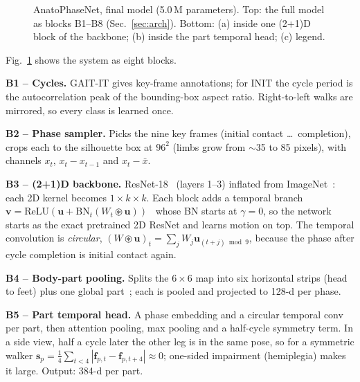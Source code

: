 \documentclass[conference]{IEEEtran}
\newcommand{\opbar}[4]{%
  \shadedraw[top color=#4!20, bottom color=#4!65, draw=#4!70!black]
    ({#1-1.5},{#2-#3/2}) rectangle ({#1+1.5},{#2+#3/2});}
\begin{document}
\begin{figure}[!t]
{}
\caption{AnatoPhaseNet, final model (5.0\,M parameters). Top: the full model as blocks
B1--B8 (Sec.~\ref{sec:arch}). Bottom: (a) inside one (2+1)D block of the backbone;
(b) inside the part temporal head; (c) legend.}
\label{fig:arch}
\end{figure}

Fig.~\ref{fig:arch} shows the system as eight blocks.

\textbf{B1 -- Cycles.} GAIT-IT gives key-frame annotations; for INIT the
cycle period is the autocorrelation peak of the bounding-box aspect ratio.
Right-to-left walks are mirrored, so every class is learned once.

\textbf{B2 -- Phase sampler.} Picks the nine key frames (initial contact
\dots\ completion), crops each to the silhouette box at $96^2$ (limbs grow from
$\sim$35 to 85 pixels), with channels $x_t$, $x_t-x_{t-1}$ and $x_t-\bar x$.

\textbf{B3 -- (2+1)D backbone.} ResNet-18~\cite{he2016resnet} (layers 1--3)
inflated from ImageNet~\cite{carreira2017i3d}: each 2D kernel becomes
$1{\times}k{\times}k$. Each block adds a temporal branch $\mathbf{v}=\mathrm{ReLU}(\mathbf{u}+\mathrm{BN}_t(W_t\circledast
\mathbf{u}))$~\cite{tran2018r21d} whose BN starts at $\gamma=0$, so the network
starts as the exact pretrained 2D ResNet and learns motion on top. The temporal
convolution is \emph{circular}, $(W\circledast\mathbf{u})_t=\sum_j
W_j\mathbf{u}_{(t+j)\bmod 9}$, because the phase after cycle completion is
initial contact again.

\textbf{B4 -- Body-part pooling.} Splits the $6\times6$ map into six horizontal
strips (head to feet) plus one global part~\cite{chao2019gaitset}; each is
pooled and projected to 128-d per phase.

\textbf{B5 -- Part temporal head.} A phase embedding and a circular
temporal conv per part, then attention pooling, max pooling and a half-cycle
symmetry term. In a side view, half a cycle later
the other leg is in the same pose, so for a symmetric walker
$\mathbf{s}_p=\frac14\sum_{t<4}|\mathbf{f}_{p,t}-\mathbf{f}_{p,t+4}|\approx0$;
one-sided impairment (hemiplegia) makes it large. Output: 384-d per part.
\end{document}
